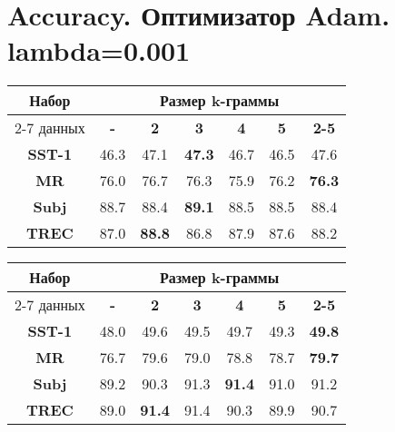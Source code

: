 
\chapter{Accuracy. Оптимизатор Adam. lambda=0.001}

\begin{minipage}{\linewidth}
\begin{center}
 \label{tab:title} 
\begin{tabular}{|c|c|c|c|c|c|c|}
\hline
\multirow{2}{*}{Набор}   &         \multicolumn{6}{c|}{Размер k-граммы} \\ \cline{2-7} 
     данных              & \textbf{-} & \textbf{2} & \textbf{3} & \textbf{4}  & \textbf{5} & \textbf{2-5} \\ \hline
\textbf{SST-1}           &  46.3    & 47.1     &\textbf{47.3}& 46.7& 46.5     & 47.6 \\  \hline
\textbf{MR}              &  76.0    & 76.7     & 76.3     & 75.9   & 76.2     & \textbf{76.3} \\ \hline
\textbf{Subj}            &  88.7    & 88.4     & \textbf{89.1}     & 88.5     & 88.5 & 88.4 \\ \hline
\textbf{TREC}            &  87.0    & \textbf{88.8} & 86.8& 87.9   & 87.6     & 88.2  \\ \hline
\end{tabular}
\vspace{5mm}
\end{center}
\end{minipage}
\vspace{5mm}

\begin{minipage}{\linewidth}
\begin{center}
 \label{tab:title} 
\begin{tabular}{|c|c|c|c|c|c|c|}
\hline
\multirow{2}{*}{Набор}   &                \multicolumn{6}{c|}{Размер k-граммы} \\ \cline{2-7} 
     данных              & \textbf{-} & \textbf{2} & \textbf{3} & \textbf{4} & \textbf{5} & \textbf{2-5} \\ \hline
\textbf{SST-1}           & 48.0     &  49.6    & 49.5    & 49.7     & 49.3     & \textbf{49.8}  \\ \hline
\textbf{MR}              & 76.7     &  79.6    & 79.0    & 78.8     & 78.7     & \textbf{79.7} \\\hline
\textbf{Subj}            & 89.2     &  90.3    & 91.3    &\textbf{91.4}& 91.0  &  91.2 \\\hline
\textbf{TREC}            & 89.0     &  \textbf{91.4}     & 91.4     & 90.3     & 89.9     &  90.7 \\\hline
\end{tabular}
\end{center}
\end{minipage}
\vspace{5mm}

